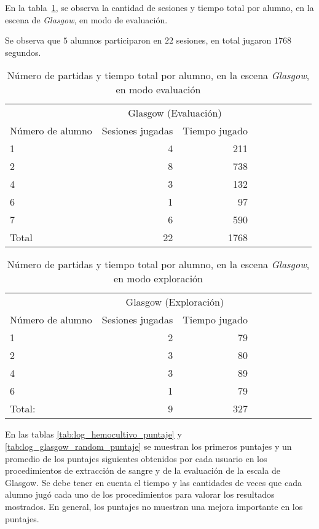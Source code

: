 En la tabla~\ref{tab:log_glasgow_random_partida}, se observa la cantidad de
sesiones y tiempo total por alumno, en la escena de \textit{Glasgow}, en modo de
evaluación.

Se observa que $5$ alumnos participaron en $22$ sesiones, en total jugaron
$1768$ segundos.

\begin{table}[!hbt]
\centering
\begin{tabular}{lrrrrrrrr}
\toprule
& \multicolumn{2}{c}{Glasgow (Evaluación)} \\
                   \cmidrule(lr){2-3} 
Número de alumno   & Sesiones jugadas                            & Tiempo jugado \\
\midrule
1     & 4  & 211 \\
2     & 8  & 738 \\
4     & 3  & 132 \\
6     & 1  & 97  \\
7     & 6  & 590 \\
\midrule
Total & 22 & 1768 \\
\bottomrule
\end{tabular}
\caption{Número de partidas y tiempo total por alumno, en la escena
    \textit{Glasgow}, en modo evaluación}
\label{tab:log_glasgow_random_partida}
\end{table}


\begin{table}[!hbt]
\centering
\begin{tabular}{lrrrrrrrr}
\toprule
& \multicolumn{2}{c}{Glasgow (Exploración)} \\
                   \cmidrule(lr){2-3} 
Número de alumno   & Sesiones jugadas                            & Tiempo jugado \\
\midrule
1        & 2 & 79 \\
2        & 3 & 80 \\
4        & 3 & 89 \\
6        & 1 & 79 \\
\midrule
Total:   & 9 & 327 \\
\bottomrule
\end{tabular}
\caption{Número de partidas y tiempo total por alumno, en la escena
    \textit{Glasgow}, en modo exploración}
\label{tab:log_glasgow_custom_partida}
\end{table}


En las tablas \ref{tab:log_hemocultivo_puntaje} y \ref{tab:log_glasgow_random_puntaje} se muestran los primeros puntajes y 
un promedio de los puntajes siguientes obtenidos por cada usuario en los procedimientos de extracción de sangre y de la 
evaluación de la escala de Glasgow. Se debe tener en cuenta el tiempo y las cantidades de veces que cada alumno jugó
cada uno de los procedimientos para valorar los resultados mostrados. En general, los puntajes no muestran una mejora 
importante en los puntajes.

